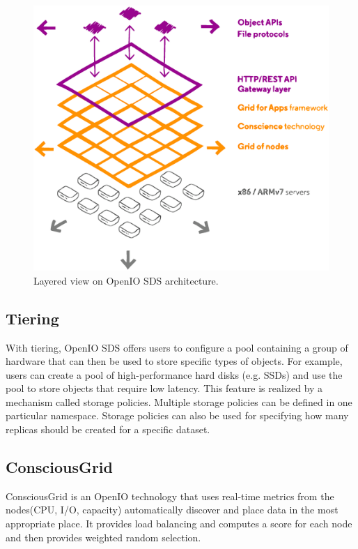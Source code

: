     \begin{figure}[hbt]
        \centering
        \includegraphics[width=1\textwidth]{obrazky-figures/openio-architecture.eps}
        \caption{Layered view on OpenIO SDS architecture.\cite{oioArch}}
        \label{fig:oioArch}
    \end{figure}


    \subsection*{Tiering}
    With tiering, OpenIO SDS offers users to configure a pool containing a group of hardware that can then be used to store specific types of objects. For example, users can create a pool of high-performance hard disks (e.g. SSDs) and use the pool to store objects that require low latency.
    This feature is realized by a mechanism called storage policies. Multiple storage policies can be defined in one particular namespace. Storage policies can also be used for specifying how many replicas should be created for a specific dataset\cite{oioCoreSolution}.

    \subsection*{ConsciousGrid}
    ConsciousGrid is an OpenIO technology that uses real-time metrics from the nodes(CPU, I/O, capacity) automatically discover and place data in the most appropriate place. It provides load balancing and computes a score for each node and then provides weighted random selection\cite{oioSdsServices}.


